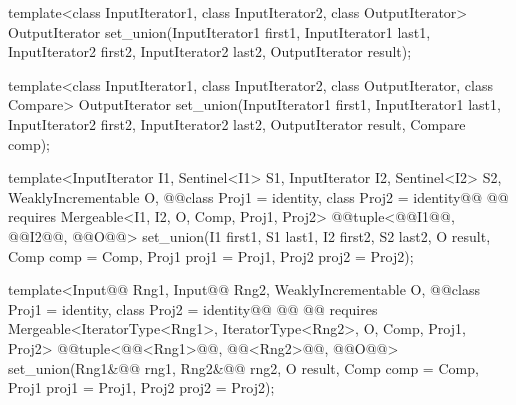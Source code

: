 %
\begin{removedblock}
\begin{itemdecl}
template<class InputIterator1, class InputIterator2,
         class OutputIterator>
  OutputIterator
    set_union(InputIterator1 first1, InputIterator1 last1,
              InputIterator2 first2, InputIterator2 last2,
              OutputIterator result);

template<class InputIterator1, class InputIterator2,
         class OutputIterator, class Compare>
  OutputIterator
    set_union(InputIterator1 first1, InputIterator1 last1,
              InputIterator2 first2, InputIterator2 last2,
              OutputIterator result, Compare comp);
\end{itemdecl}
\end{removedblock}
\begin{addedblock}
\begin{itemdecl}
template<InputIterator I1, Sentinel<I1> S1, InputIterator I2, Sentinel<I2> S2,
    WeaklyIncrementable O, @@class Proj1 = identity, class Proj2 = identity@\oldtxt{,}\newtxt{>}@
    @@
  requires Mergeable<I1, I2, O, Comp, Proj1, Proj2>
  @@tuple<@@I1@\newtxt{)}@, @@I2@\newtxt{)}@, @@O@\newtxt{)}@>
    set_union(I1 first1, S1 last1, I2 first2, S2 last2, O result, Comp comp = Comp{},
              Proj1 proj1 = Proj1{}, Proj2 proj2 = Proj2{});

template<Input@@ Rng1, Input@@ Rng2, WeaklyIncrementable O,
    @@class Proj1 = identity, class Proj2 = identity@\oldtxt{,}\newtxt{>}@
    @@
      @@
  requires Mergeable<IteratorType<Rng1>, IteratorType<Rng2>, O, Comp, Proj1, Proj2>
  @@tuple<@@<Rng1>@\newtxt{)}@,
               @@<Rng2>@\newtxt{)}@,
               @@O@\newtxt{)}@>
    set_union(Rng1&@\newtxt{\&}@ rng1, Rng2&@\newtxt{\&}@ rng2, O result, Comp comp = Comp{},
              Proj1 proj1 = Proj1{}, Proj2 proj2 = Proj2{});
\end{itemdecl}
\end{addedblock}

